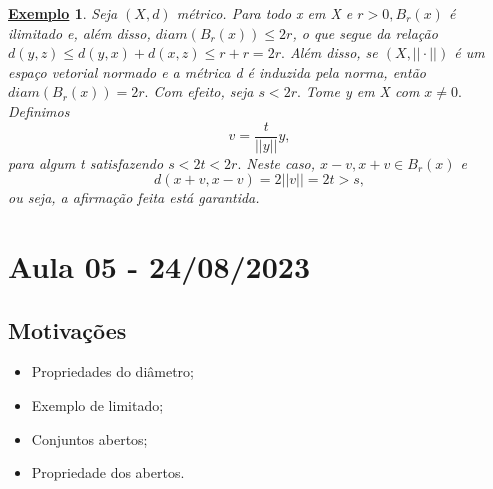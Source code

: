 \documentclass{article}
\newtheorem{example}{\underline{Exemplo}}
\begin{document}
\begin{example}
  Seja \((X, d)\) métrico. Para todo x em X e \(r>0, B_{r}(x)\) é ilimitado e, além disso, \(diam(B_{r}(x))\leq 2r\), o que segue da relação
 \(d(y, z)\leq d(y, x) + d(x, z)\leq r + r = 2r.\) Além disso, se \((X, ||\cdot ||)\) é um espaço vetorial normado e a métrica d é induzida pela norma,
 então \(diam(B_{r}(x)) = 2r.\) Com efeito, seja \(s < 2r.\) Tome y em X com \(x\neq0.\) Definimos 
   \[
     v = \frac{t}{||y||}y,
   \]
   para algum t satisfazendo \(s < 2t < 2r.\) Neste caso, \(x-v, x+v\in B_{r}(x)\)  e 
     \[
       d(x+v, x-v) = 2||v|| = 2t > s,
     \]
     ou seja, a afirmação feita está garantida.
\end{example}
\newpage

\section{Aula 05 - 24/08/2023}
\subsection{Motivações}
\begin{itemize}
  \item Propriedades do diâmetro;
  \item Exemplo de limitado;
  \item Conjuntos abertos;
  \item Propriedade dos abertos.
\end{itemize}
\end{document}
